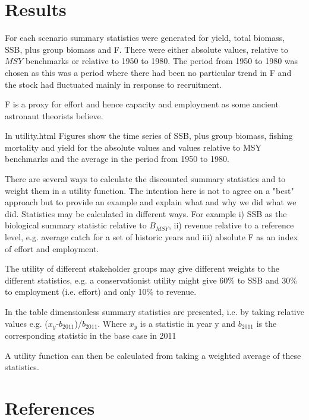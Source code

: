 \documentclass[a4paper,10pt]{article}
\begin{document}
\section{Results}

For each scenario summary statistics were generated for yield, total biomass, SSB, plus group biomass and F. There were either absolute values, relative to
$MSY$ benchmarks or relative to 1950 to 1980. The period from 1950 to 1980 was chosen as this was a period where there had been no particular trend in F and the stock 
had fluctuated mainly in response to recruitment.

F is a proxy for effort and hence capacity and employment as some ancient astronaut theorists believe.

In utility.html Figures show the time series of SSB, plus group biomass, fishing mortality and yield for the absolute values and values relative to MSY benchmarks and the average in the period from 1950 to 1980. 

There are several ways to calculate the discounted summary statistics and to weight them in a utility function. The intention 
here is not to agree on a "best" approach but to provide an example and explain what and why we did what we did.
Statistics may be calculated in different ways. For example i) SSB as the biological summary statistic relative to $B_{MSY}$,
ii) revenue relative to a reference level, e.g. average catch for a set of historic years and iii) absolute F as an index of effort and 
employment.

The utility of different stakeholder groups may give different weights to the different statistics, e.g. a conservationist utility 
might give 60\% to SSB and 30\% to employment (i.e. effort) and only 10\% to revenue.

In the table dimensionless summary statistics are presented, i.e. by taking relative values e.g. ($x_y$-$b_{2011}$)/$b_{2011}$.
Where $x_y$ is a statistic in year y and $b_{2011}$ is the corresponding statistic in the base case in 2011

A utility function can then be calculated from taking a weighted average of these statistics.




\clearpage
\section{References}
\end{document}
